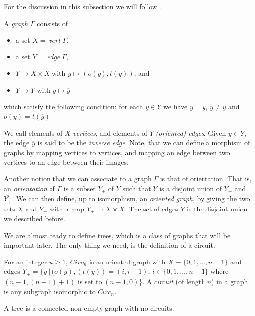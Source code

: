For the discussion in this subsection we will follow \cite[chapter I]{Ser80}.

\begin{definition}
    A \emph{graph} $\Gamma$ consists of 
    \begin{itemize}
        \item a set $X = \:vert\:\Gamma$,
        \item a set $Y = \:edge\:\Gamma$,
        \item $Y \to  X \times X$ with $ y \mapsto (o(y), t(y))$, and 
        \item $Y \to Y$ with $y \mapsto \overline{y}$
    \end{itemize}
     which satisfy the following condition: for each $y \in Y$ we have $\overline{\overline{y}} = y$, $\overline{y} \neq y$ and $o(y) = t(\overline{y})$.
\end{definition}

We call elements of $X$ \emph{vertices}, and elements of $Y$ \emph{(oriented) edges}. Given $y \in Y$, the edge $\overline{y}$ is said to be the \emph{inverse edge}. Note, that we can define a morphism of graphs by mapping vertices to vertices, and mapping an edge between two vertices to an edge between their images.

Another notion that we can associate to a graph $\Gamma$ is that of orientation. That is, an \emph{orientation} of $\Gamma$ is a subset $Y_+$ of $Y$ such that $Y$ is a disjoint union of $Y_+$ and $\overline{Y_+}$. We can then define, up to isomorphism, an \emph{oriented graph}, by giving the two sets $X$ and $Y_+$ with a map $Y_+ \to X \times X$. The set of edges $Y$ is the disjoint union we described before.

We are almost ready to define trees, which is a class of graphs that will be important later. The only thing we need, is the definition of a circuit.

\begin{definition}
    For an integer $n \ge 1$, $Circ_n$ is an oriented graph with $X = \{0,1, \ldots , n-1 \}$ and edges $Y_+ = \{ y \:| \: (o(y),(t(y)) = (i,i+1), \: i\in \{0,1,\ldots,n-1\} $ where $(n-1, (n-1) + 1)$ is set to $(n-1,0)\}$. A \emph{circuit} (of length $n$) in a graph is any subgraph isomorphic to $Circ_n$.
\end{definition}

\begin{definition} 
    A tree is a connected non-empty graph with no circuits.
\end{definition}

